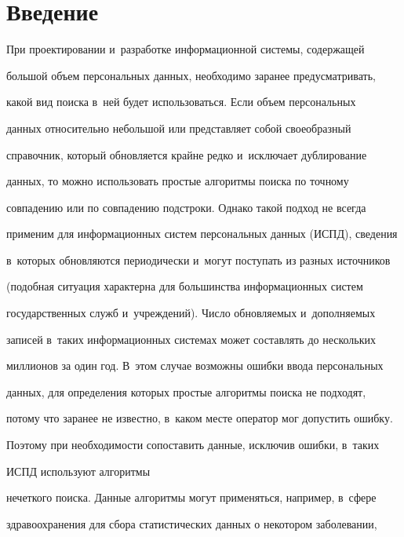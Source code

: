       \vspace*{-12pt} 


  


\section{Введение}





  При проектировании и~разработке информационной системы, содержащей 


большой объем персональных данных, необходимо заранее предусматривать, 


какой вид поиска в~ней будет использоваться. Если объем персональных 


данных относительно небольшой или представляет собой своеобразный 


справочник, который обновляется крайне редко и~исключает дублирование 


данных, то можно использовать простые алгоритмы поиска по точному 


совпадению или по совпадению подстроки. Однако такой подход не всегда 


применим для информационных систем персональных данных (ИСПД), сведения 


в~которых обновляются периодически и~могут поступать из разных источников 


(подобная ситуация характерна для большинства информационных систем 


государственных служб и~учреждений). Число обновляемых и~дополняемых 


записей в~таких информационных системах может составлять до нескольких 


миллионов за один год. В~этом случае возможны ошибки ввода персональных 


данных, для определения которых простые алгоритмы поиска не подходят, 


потому что заранее не известно, в~каком месте оператор мог допустить ошибку. 


Поэтому при необходимости сопоставить данные, исключив ошибки, в~таких 


ИСПД используют алгоритмы 


нечеткого поиска. Данные алгоритмы могут применяться, например, в~сфере 


здравоохранения для сбора статистических данных о некотором заболевании, 


